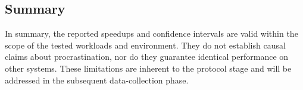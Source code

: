 \subsection{Summary}
In summary, the reported speedups and confidence intervals are valid within the scope of the tested workloads and environment. They do not establish causal claims about procrastination, nor do they guarantee identical performance on other systems. These limitations are inherent to the protocol stage and will be addressed in the subsequent data-collection phase.
